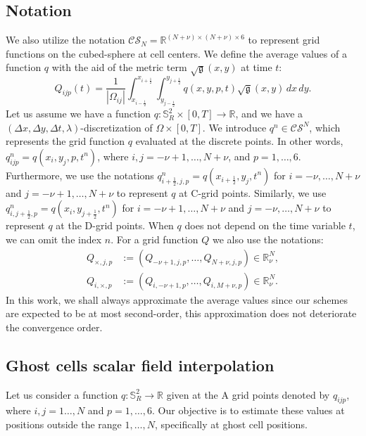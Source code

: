 \subsection{Notation}
\label{cs-notation}
We also utilize the notation $\mathcal{CS}_N=\mathbb{R}^{(N+\nu)\times(N+\nu)\times 6}$
to represent grid functions on the cubed-sphere at cell centers.
We define the average values of a function $q$ with the aid of the metric term
$\sqrt{\mathfrak{g}}(x,y)$ at time $t$: 
\begin{equation*}
	Q_{ijp}(t) = \frac{1}{|\Omega_{ij}|}\int_{x_{i-\frac{1}{2}}}^{x_{i+\frac{1}{2}}}
	\int_{y_{j-\frac{1}{2}}}^{y_{j+\frac{1}{2}}}  q(x,y,p,t) {\sqrt{\mathfrak{g}}(x,y)}\,dx \,dy.
\end{equation*}
Let us assume we have a function $q:\mathbb{S}^2_R\times[0,T] \to \mathbb{R}$, 
and we have a $(\Delta x, \Delta y, \Delta t, \lambda)$-discretization of $\Omega \times [0,T]$.
We introduce $q^n \in \mathcal{CS}^N$, which represents the grid function $q$
evaluated at the discrete points. 
In other words, $q^n_{ijp} = q(x_i,y_j,p,t^n)$, where $i,j=-\nu +1, \ldots, N+\nu$, and $p=1, \ldots, 6$.
Furthermore, we use the notations $q^n_{i+\frac{1}{2},j,p} = q(x_{i+\frac{1}{2}},y_j, t^n)$ 
for $i=-\nu, \ldots, N+\nu$ and $j=-\nu +1, \ldots, N+\nu$ to represent $q$ at C-grid points.
Similarly, we use $q^n_{i,j+\frac{1}{2},p} = q(x_i,y_{j+\frac{1}{2}},t^n)$ for $i=-\nu +1, \ldots, N+\nu$ and $j=-\nu, \ldots, N+\nu$ to represent $q$ at the
D-grid points.
When $q$ does not depend on the time variable $t$, we can omit the index $n$.
For a grid function $Q$ we also use the notations:
\begin{align*}
	Q_{\times,j,p} &:= (Q_{-\nu+1,j,p}, \ldots, Q_{N+\nu,j,p}) \in \mathbb{R}^{N}_{\nu},\\
	Q_{i,\times,p} &:= (Q_{i,-\nu+1,p}, \ldots, Q_{i,M+\nu,p}) \in \mathbb{R}^{N}_{\nu}.
\end{align*}
In this work, we shall always approximate the average values since our schemes are expected to be at most second-order,
this approximation does not deteriorate the convergence order.

\subsection{Ghost cells scalar field interpolation}
\label{cs-interp}
Let us consider a function $q: \mathbb{S}^2_R \to \mathbb{R}$ given at the A grid points
denoted by $q_{ijp}$, where $i, j=1\ldots, N$ and $p=1,\ldots, 6$. 
Our objective is to estimate these values at positions outside the range $1, \ldots, N$, specifically at ghost cell positions.

